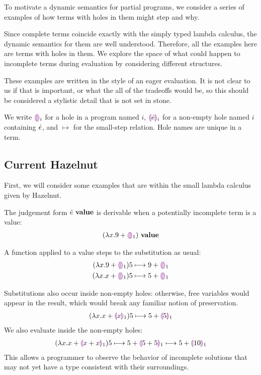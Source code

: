 To motivate a dynamic semantics for partial programs, we consider a series
of examples of how terms with holes in them might step and why.

Since complete terms coincide exactly with the simply typed lambda
calculus, the dynamic semantics for them are well understood. Therefore,
all the examples here are terms with holes in them. We explore the space of
what could happen to incomplete terms during evaluation by considering
different structures.

These examples are written in the style of an eager evaluation. It is not
clear to us if that is important, or what the all of the tradeoffs would
be, so this should be considered a stylistic detail that is not set in
stone.

We write $\textcolor{violet}{\llparenthesis}\textcolor{violet}{\rrparenthesis}_i$ for a hole in a program named $i$, $\textcolor{violet}{\llparenthesis}\dot{e}\textcolor{violet}{\rrparenthesis}_i$
for a non-empty hole named $i$ containing $\dot{e}$, and $\mapsto$ for the
small-step relation. Hole names are unique in a term.

\subsection{Current Hazelnut}
First, we will consider some examples that are within the small lambda
calculus given by Hazelnut.

The judgement form ${\dot{e}} ~\mathbf{value}$ is derivable when a potentially
incomplete term is a value:
\begin{align*}
  {(\lambda x. 9 + \textcolor{violet}{\llparenthesis}\textcolor{violet}{\rrparenthesis}_1)} ~\mathbf{value}
\end{align*}

A function applied to a value steps to the substitution as usual:
\begin{align*}
  {
        (\lambda x.9 + \textcolor{violet}{\llparenthesis}\textcolor{violet}{\rrparenthesis}_1)5
      } \longmapsto {
        9 + \textcolor{violet}{\llparenthesis}\textcolor{violet}{\rrparenthesis}_1
      }
      \\
      {
        (\lambda x.x + \textcolor{violet}{\llparenthesis}\textcolor{violet}{\rrparenthesis}_1)5
      } \longmapsto {
        5 + \textcolor{violet}{\llparenthesis}\textcolor{violet}{\rrparenthesis}_1
      }
\end{align*}

Substitutions also occur inside non-empty holes: otherwise, free variables
would appear in the result, which would break any familiar notion of
preservation.
\begin{align*}
  {
        (\lambda x.x + \textcolor{violet}{\llparenthesis}x\textcolor{violet}{\rrparenthesis}_1)5
      } \longmapsto {
        5 + \textcolor{violet}{\llparenthesis}5\textcolor{violet}{\rrparenthesis}_1
      }
\end{align*}
We also evaluate inside the non-empty holes:
\begin{align*}
  {
    {
          (\lambda x.x + \textcolor{violet}{\llparenthesis}x + x\textcolor{violet}{\rrparenthesis}_1)5
        } \longmapsto {
          5 + \textcolor{violet}{\llparenthesis}5 + 5\textcolor{violet}{\rrparenthesis}_1
        }
  } \longmapsto {5 + \textcolor{violet}{\llparenthesis}10\textcolor{violet}{\rrparenthesis}_1}
\end{align*}
This allows a programmer to observe the behavior of incomplete solutions
that may not yet have a type consistent with their surroundings.

